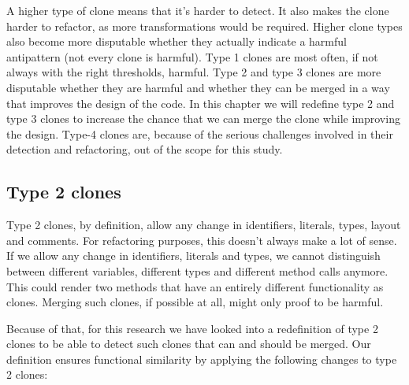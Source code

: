 \documentclass[a4paper]{article}
\begin{document}
A higher type of clone means that it's harder to detect. It also makes the clone harder to refactor, as more transformations would be required. Higher clone types also become more disputable whether they actually indicate a harmful antipattern (not every clone is harmful). Type 1 clones are most often, if not always with the right thresholds, harmful. Type 2 and type 3 clones are more disputable whether they are harmful and whether they can be merged in a way that improves the design of the code. In this chapter we will redefine type 2 and type 3 clones to increase the chance that we can merge the clone while improving the design. Type-4 clones are, because of the serious challenges involved in their detection and refactoring, out of the scope for this study.

\subsection{Type 2 clones}
Type 2 clones, by definition, allow any change in identifiers, literals, types, layout and comments. For refactoring purposes, this doesn't always make a lot of sense. If we allow any change in identifiers, literals and types, we cannot distinguish between different variables, different types and different method calls anymore. This could render two methods that have an entirely different functionality as clones. Merging such clones, if possible at all, might only proof to be harmful.

Because of that, for this research we have looked into a redefinition of type 2 clones to be able to detect such clones that can and should be merged. Our definition ensures functional similarity by applying the following changes to type 2 clones:
\end{document}
